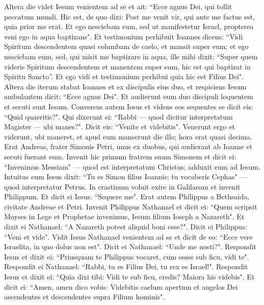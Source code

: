 \begin{biblechapter}
\verse Altera die videt Iesum venientem ad se et ait: “Ecce agnus Dei, qui tollit peccatum mundi. 
\verse Hic est, de quo dixi: Post me venit vir, qui ante me factus est, quia prior me erat. 
\verse Et ego nesciebam eum, sed ut manifestetur Israel, propterea veni ego in aqua baptizans". 
\verse Et testimonium perhibuit Ioannes dicens: “Vidi Spiritum descendentem quasi columbam de caelo, et mansit super eum; 
\verse et ego nesciebam eum, sed, qui misit me baptizare in aqua, ille mihi dixit: “Super quem videris Spiritum descendentem et manentem super eum, hic est qui baptizat in Spiritu Sancto”. 
\verse Et ego vidi et testimonium perhibui quia hic est Filius Dei". 
\verse Altera die iterum stabat Ioannes et ex discipulis eius duo, 
\verse et respiciens Iesum ambulantem dicit: “Ecce agnus Dei". 
\verse Et audierunt eum duo discipuli loquentem et secuti sunt Iesum. 
\verse Conversus autem Iesus et videns eos sequentes se dicit eis: “Quid quaeritis?". Qui dixerunt ei: “Rabbi — quod dicitur interpretatum Magister — ubi manes?". 
\verse Dicit eis: “Venite et videbitis". Venerunt ergo et viderunt, ubi maneret, et apud eum manserunt die illo; hora erat quasi decima. 
\verse Erat Andreas, frater Simonis Petri, unus ex duobus, qui audierant ab Ioanne et secuti fuerant eum. 
\verse Invenit hic primum fratrem suum Simonem et dicit ei: “Invenimus Messiam" — quod est interpretatum Christus; 
\verse adduxit eum ad Iesum. Intuitus eum Iesus dixit: “Tu es Simon filius Ioannis; tu vocaberis Cephas" — quod interpretatur Petrus. 
\verse In crastinum voluit exire in Galilaeam et invenit Philippum. Et dicit ei Iesus: “Sequere me". 
\verse Erat autem Philippus a Bethsaida, civitate Andreae et Petri. 
\verse Invenit Philippus Nathanael et dicit ei: “Quem scripsit Moyses in Lege et Prophetae invenimus, Iesum filium Ioseph a Nazareth". 
\verse Et dixit ei Nathanael: “A Nazareth potest aliquid boni esse?". Dicit ei Philippus: “Veni et vide". 
\verse Vidit Iesus Nathanael venientem ad se et dicit de eo: “Ecce vere Israelita, in quo dolus non est". 
\verse Dicit ei Nathanael: “Unde me nosti?". Respondit Iesus et dixit ei: “Priusquam te Philippus vocaret, cum esses sub ficu, vidi te". 
\verse Respondit ei Nathanael: “Rabbi, tu es Filius Dei, tu rex es Israel!". 
\verse Respondit Iesus et dixit ei: “Quia dixi tibi: Vidi te sub ficu, credis? Maiora his videbis". 
\verse Et dicit ei: “Amen, amen dico vobis: Videbitis caelum apertum et angelos Dei ascendentes et descendentes supra Filium hominis". 
\end{biblechapter}

